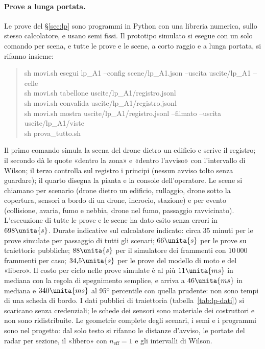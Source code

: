 \paragraph{Prove a lunga portata.} Le prove del \S\ref{sec:lp} sono programmi in Python con una libreria numerica, sullo stesso calcolatore, e usano semi fissi. Il prototipo simulato si esegue con un solo comando per scena, e tutte le prove e le scene, a corto raggio e a lunga portata, si rifanno insieme:
\begin{quote}\small\ttfamily
sh movi.sh esegui lp\_A1 --config scene/lp\_A1.json --uscita uscite/lp\_A1 --celle\\
sh movi.sh tabellone uscite/lp\_A1/registro.jsonl\\
sh movi.sh convalida uscite/lp\_A1/registro.jsonl\\
sh movi.sh mostra uscite/lp\_A1/registro.jsonl --filmato --uscita uscite/lp\_A1/viste\\
sh prova\_tutto.sh
\end{quote}
Il primo comando simula la scena del drone dietro un edificio e scrive il registro; il secondo dà le quote «dentro la zona» e «dentro l'avviso» con l'intervallo di Wilson; il terzo controlla sul registro i principi (nessun avviso tolto senza guardare); il quarto disegna la pianta e la console dell'operatore. Le scene si chiamano per scenario (drone dietro un edificio, rullaggio, drone sotto la copertura, sensori a bordo di un drone, incrocio, stazione) e per evento (collisione, avaria, fumo e nebbia, drone nel fumo, passaggio ravvicinato). L'esecuzione di tutte le prove e le scene ha dato esito senza errori in $698\unita{s}$. Durate indicative sul calcolatore indicato: circa 35 minuti per le prove simulate per passaggio di tutti gli scenari; $66\unita{s}$ per le prove su traiettorie pubbliche; $88\unita{s}$ per il simulatore dei frammenti con $10\,000$ frammenti per caso; $34{,}5\unita{s}$ per le prove del modello di moto e del «libero». Il costo per ciclo nelle prove simulate è al più $11\unita{ms}$ in mediana con la regola di spegnimento semplice, e arriva a $46\unita{ms}$ in mediana e $340\unita{ms}$ al 95º percentile con quella prudente: non sono tempi di una scheda di bordo. I dati pubblici di traiettoria (tabella~\ref{tab:lp-dati}) si scaricano senza credenziali; le schede dei sensori sono materiale dei costruttori e non sono ridistribuite. Le geometrie complete degli scenari, i semi e i programmi sono nel progetto: dal solo testo si rifanno le distanze d'avviso, le portate del radar per sezione, il «libero» con $n_{\mathrm{eff}}=1$ e gli intervalli di Wilson.

